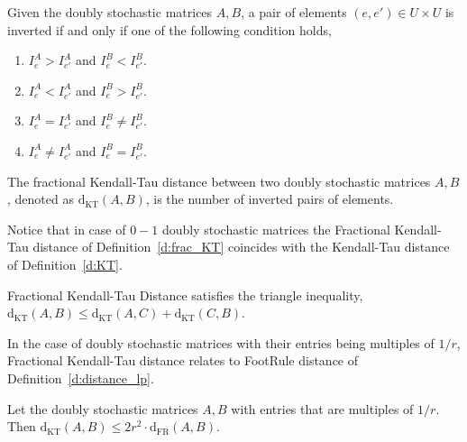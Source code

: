 \documentclass[a4paper,UKenglish,cleveref,autoref, thm-restate]{lipics-v2019}
\def\dkt{\mathrm{d}_{\mathrm{KT}}}
\def\dfr{\mathrm{d}_{\mathrm{FR}}}
\begin{document}
\begin{definition}\label{d:frac_KT} Given the doubly stochastic matrices $A,B$, a pair of elements $(e, e') \in U \times U$ is inverted if and only if one of the following condition holds,
\begin{enumerate}
    \item $I_e^A > I_{e'}^A$ and $I_e^B < I_{e'}^B$.
    \item $I_e^A < I_{e'}^A$ and $I_e^B > I_{e'}^B$.
    \item $I_e^A = I_{e'}^A$ and $I_e^B \neq I_{e'}^B$.
    \item $I_e^A \neq I_{e'}^A$ and $I_e^B = I_{e'}^B$.
\end{enumerate}
The fractional Kendall-Tau distance between two doubly stochastic matrices $A,B$, denoted as $\dkt(A,B)$, is the number of inverted pairs of elements. 
\end{definition}
\noindent Notice that in case of $0-1$ doubly stochastic matrices the Fractional Kendall-Tau distance of Definition~\ref{d:frac_KT} coincides with the Kendall-Tau distance of Definition~\ref{d:KT}. 

\begin{claim}\label{c:metric}
Fractional Kendall-Tau Distance satisfies the triangle inequality, $\dkt(A,B) \leq \dkt(A,C) + \dkt(C,B)$.
\end{claim}
\noindent In the case of doubly stochastic matrices with their entries being multiples of $1/r$, Fractional Kendall-Tau distance relates to FootRule distance of Definition~\ref{d:distance_lp}.
\begin{lemma}\label{l:equivalence}
    Let the doubly stochastic matrices $A,B$ with entries that are multiples of $1/r$. Then $\dkt ( A, B ) \leq 2r^2 \cdot  \dfr( A, B )$.
\end{lemma}
\end{document}
